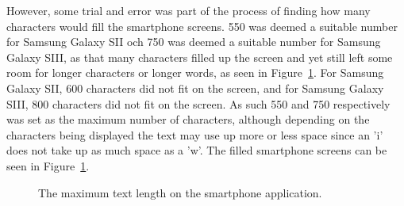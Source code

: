 However, some trial and error was part of the process of finding how many characters would fill the smartphone screens. 550 was deemed a suitable number for Samsung Galaxy SII och 750 was deemed a suitable number for Samsung Galaxy SIII, as that many characters filled up the screen and yet still left some room for longer characters or longer words, as seen in Figure~\ref{glassTestTextLengthRaw}. For Samsung Galaxy SII, 600 characters did not fit on the screen, and for Samsung Galaxy SIII, 800 characters did not fit on the screen. As such 550 and 750 respectively was set as the maximum number of characters, although depending on the characters being displayed the text may use up more or less space since an 'i' does not take up as much space as a 'w'. The filled smartphone screens can be seen in Figure~\ref{glassTestTextLengthRaw}.

	\begin{figure}[H]%
		\centering
   		 \qquad
   		 \qquad
		\caption{The maximum text length on the smartphone application.}
		\label{glassTestTextLengthRaw}
	\end{figure}

